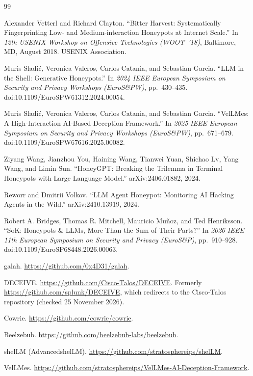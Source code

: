 \documentclass[a4paper,11pt]{article}
\begin{document}
\begin{thebibliography}{99}

Alexander Vetterl and Richard Clayton. ``Bitter Harvest: Systematically
Fingerprinting Low- and Medium-interaction Honeypots at Internet Scale.'' In
\emph{12th USENIX Workshop on Offensive Technologies (WOOT~'18)}, Baltimore,
MD, August 2018. USENIX Association.

Muris Sladi\'c, Veronica Valeros, Carlos Catania, and Sebastian Garcia. ``LLM in
the Shell: Generative Honeypots.'' In \emph{2024 IEEE European Symposium on
Security and Privacy Workshops (EuroS\&PW)}, pp.~430--435.
doi:10.1109/EuroSPW61312.2024.00054.

Muris Sladi\'c, Veronica Valeros, Carlos Catania, and Sebastian Garcia.
``VelLMes: A High-Interaction AI-Based Deception Framework.'' In \emph{2025
IEEE European Symposium on Security and Privacy Workshops (EuroS\&PW)}, pp.~671--679.
doi:10.1109/EuroSPW67616.2025.00082.

Ziyang Wang, Jianzhou You, Haining Wang, Tianwei Yuan, Shichao Lv, Yang Wang,
and Limin Sun. ``HoneyGPT: Breaking the Trilemma in Terminal Honeypots with
Large Language Model.'' arXiv:2406.01882, 2024.

Reworr and Dmitrii Volkov. ``LLM Agent Honeypot: Monitoring AI Hacking Agents in
the Wild.'' arXiv:2410.13919, 2024.

Robert A. Bridges, Thomas R. Mitchell, Mauricio Mu\~noz, and Ted Henriksson.
``SoK: Honeypots \& LLMs, More Than the Sum of Their Parts?'' In \emph{2026 IEEE
11th European Symposium on Security and Privacy (EuroS\&P)}, pp.~910--928.
doi:10.1109/EuroSP68448.2026.00063.

galah. \url{https://github.com/0x4D31/galah}.

DECEIVE. \url{https://github.com/Cisco-Talos/DECEIVE}. Formerly
\url{https://github.com/splunk/DECEIVE}, which redirects to the Cisco-Talos
repository (checked 25 November 2026).

Cowrie. \url{https://github.com/cowrie/cowrie}.

Beelzebub. \url{https://github.com/beelzebub-labs/beelzebub}.

shelLM (AdvancedshelLM). \url{https://github.com/stratosphereips/shelLM}.

VelLMes. \url{https://github.com/stratosphereips/VelLMes-AI-Deception-Framework}.

\end{thebibliography}
\end{document}
